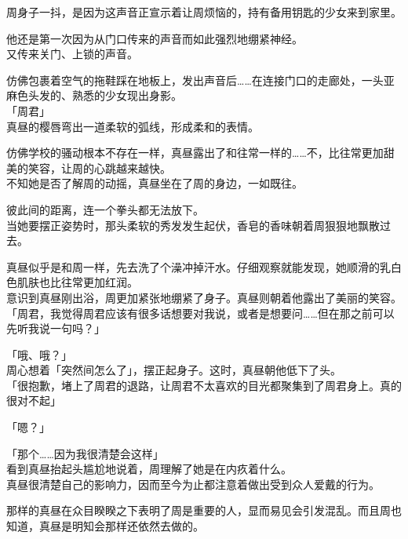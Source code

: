周身子一抖，是因为这声音正宣示着让周烦恼的，持有备用钥匙的少女来到家里。

他还是第一次因为从门口传来的声音而如此强烈地绷紧神经。\\

又传来关门、上锁的声音。

仿佛包裹着空气的拖鞋踩在地板上，发出声音后……在连接门口的走廊处，一头亚麻色头发的、熟悉的少女现出身影。\\

「周君」\\

真昼的樱唇弯出一道柔软的弧线，形成柔和的表情。

仿佛学校的骚动根本不存在一样，真昼露出了和往常一样的……不，比往常更加甜美的笑容，让周的心跳越来越快。\\

不知她是否了解周的动摇，真昼坐在了周的身边，一如既往。

彼此间的距离，连一个拳头都无法放下。\\

当她要摆正姿势时，那头柔软的秀发发生起伏，香皂的香味朝着周狠狠地飘散过去。

真昼似乎是和周一样，先去洗了个澡冲掉汗水。仔细观察就能发现，她顺滑的乳白色肌肤也比往常更加红润。\\

意识到真昼刚出浴，周更加紧张地绷紧了身子。真昼则朝着他露出了美丽的笑容。\\

「周君，我觉得周君应该有很多话想要对我说，或者是想要问……但在那之前可以先听我说一句吗？」

「哦、哦？」\\

周心想着「突然间怎么了」，摆正起身子。这时，真昼朝他低下了头。\\

「很抱歉，堵上了周君的退路，让周君不太喜欢的目光都聚集到了周君身上。真的很对不起」

「嗯？」

「那个……因为我很清楚会这样」\\

看到真昼抬起头尴尬地说着，周理解了她是在内疚着什么。\\

真昼很清楚自己的影响力，因而至今为止都注意着做出受到众人爱戴的行为。

那样的真昼在众目睽睽之下表明了周是重要的人，显而易见会引发混乱。而且周也知道，真昼是明知会那样还依然去做的。\\

